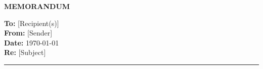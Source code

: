 \documentclass[11pt,letterpaper]{article}
\begin{document}
\begin{center}
\textbf{\Large MEMORANDUM}
\end{center}

\vspace{0.5cm}

\noindent\textbf{To:} [Recipient(s)] \\
\textbf{From:} [Sender] \\
\textbf{Date:} \today \\
\textbf{Re:} [Subject]

\noindent\rule{\textwidth}{0.4pt}

\vspace{0.5cm}




\end{document}
